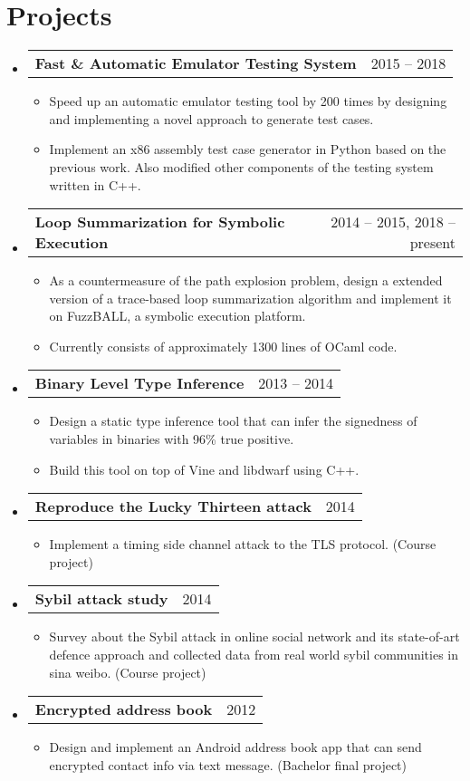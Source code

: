 \documentclass[letterpaper,11pt]{article}
\makeatletter
\newcommand{\myitem}[1]{
  \item[-]\small{
    { #1 \vspace{-2pt}}
  }
}
\newcommand{\project}[3]{
  \vspace{-1pt}\item[]
  \begin{tabular*}{0.97\textwidth}{l@{\extracolsep{\fill}}r}
  \textbf{\small#1} & {\small#2}\\
  \end{tabular*}
      {\small#3}\vspace{-5pt}
}
\newcommand{\content}{\begin{itemize}[leftmargin=0px]}
\newcommand{\contentend}{\end{itemize}}
\newcommand{\mylist}{\begin{itemize}[leftmargin=25px,rightmargin=25px]}
\newcommand{\mylistend}{\end{itemize}\vspace{-5pt}}
\makeatother
\begin{document}
\section{Projects}
  \content  	
    \project
      {Fast \& Automatic Emulator Testing System}{2015 -- 2018}{}
    \mylist
        \myitem
          {Speed up an automatic emulator testing tool by 200 times by designing and
          implementing a novel approach to generate test cases.}
        \myitem{
          Implement an x86 assembly test case generator in Python based on the previous work.
          Also modified other components of the testing system written in C++.
        }
      \mylistend         
    \project
      {Loop Summarization for Symbolic Execution}{2014 -- 2015, 2018 -- present}{}  
      \mylist
        \myitem{
          As a countermeasure of the path explosion problem, 
          design a extended version of a trace-based loop summarization algorithm\cite{Godefroid2011}
          and implement it on FuzzBALL, a symbolic execution platform.
        }   
        \myitem{
          Currently consists of approximately 1300 lines of OCaml code.
        }
      \mylistend          
    \project
      {Binary Level Type Inference}{2013 -- 2014}{}
      \mylist
        \myitem
          {Design a static type inference tool that can infer 
          the signedness of variables in binaries with 96\% true positive.}        
        \myitem{
          Build this tool on top of Vine and libdwarf using C++.
        }
      \mylistend       
    \project
    {Reproduce the Lucky Thirteen attack}{2014}{}
    \mylist
      \myitem{
        Implement a timing side channel attack \cite{AlFardan2013} to the TLS protocol. 
        (Course project)}
    \mylistend
    \project
      {Sybil attack study}{2014}{}
      \mylist
        \myitem{
          Survey about the Sybil attack in online social network and its state-of-art defence approach      
          and collected data from real world sybil communities in sina weibo. (Course project)}
      \mylistend
    \project
      {Encrypted address book}{2012}{}
      \mylist
        \myitem{
          Design and implement an Android address book app that can send encrypted contact info via text message. 
          (Bachelor final project)}
        \mylistend      
  \contentend

%
\end{document}
